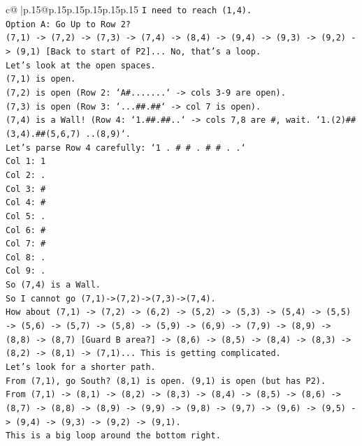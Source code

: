 \documentclass{article}
\begin{document}
{\begin{supertabular}{c@{$\;$}|p{.15\linewidth}@{}p{.15\linewidth}p{.15\linewidth}p{.15\linewidth}p{.15\linewidth}p{.15\linewidth}}
{{{\texttt{I need to reach (1,4).} \\
\texttt{Option A: Go Up to Row 2?} \\
\texttt{(7,1) {-}> (7,2) {-}> (7,3) {-}> (7,4) {-}> (8,4) {-}> (9,4) {-}> (9,3) {-}> (9,2) {-}> (9,1) {[}Back to start of P2{]}... No, that's a loop.} \\
\texttt{Let's look at the open spaces.} \\
\texttt{(7,1) is open.} \\
\texttt{(7,2) is open (Row 2: `A\#.......` {-}> cols 3{-}9 are open).} \\
\texttt{(7,3) is open (Row 3: `...\#\#.\#\#` {-}> col 7 is open).} \\
\texttt{(7,4) is a Wall! (Row 4: `1.\#\#.\#\#..` {-}> cols 7,8 are \#, wait. `1.(2)\#\#(3,4).\#\#(5,6,7) ..(8,9)`.} \\
\texttt{Let's parse Row 4 carefully: `1 . \# \# . \# \# . .`} \\
\texttt{Col 1: 1} \\
\texttt{Col 2: .} \\
\texttt{Col 3: \#} \\
\texttt{Col 4: \#} \\
\texttt{Col 5: .} \\
\texttt{Col 6: \#} \\
\texttt{Col 7: \#} \\
\texttt{Col 8: .} \\
\texttt{Col 9: .} \\
\texttt{So (7,4) is a Wall.} \\
\texttt{So I cannot go (7,1){-}>(7,2){-}>(7,3){-}>(7,4).} \\
\texttt{How about (7,1) {-}> (7,2) {-}> (6,2) {-}> (5,2) {-}> (5,3) {-}> (5,4) {-}> (5,5) {-}> (5,6) {-}> (5,7) {-}> (5,8) {-}> (5,9) {-}> (6,9) {-}> (7,9) {-}> (8,9) {-}> (8,8) {-}> (8,7) {[}Guard B area?{]} {-}> (8,6) {-}> (8,5) {-}> (8,4) {-}> (8,3) {-}> (8,2) {-}> (8,1) {-}> (7,1)... This is getting complicated.} \\
\texttt{Let's look for a shorter path.} \\
\texttt{From (7,1), go South? (8,1) is open. (9,1) is open (but has P2).} \\
\texttt{From (7,1) {-}> (8,1) {-}> (8,2) {-}> (8,3) {-}> (8,4) {-}> (8,5) {-}> (8,6) {-}> (8,7) {-}> (8,8) {-}> (8,9) {-}> (9,9) {-}> (9,8) {-}> (9,7) {-}> (9,6) {-}> (9,5) {-}> (9,4) {-}> (9,3) {-}> (9,2) {-}> (9,1).} \\
\texttt{This is a big loop around the bottom right.} \\
}}}
\end{supertabular}}
\end{document}
